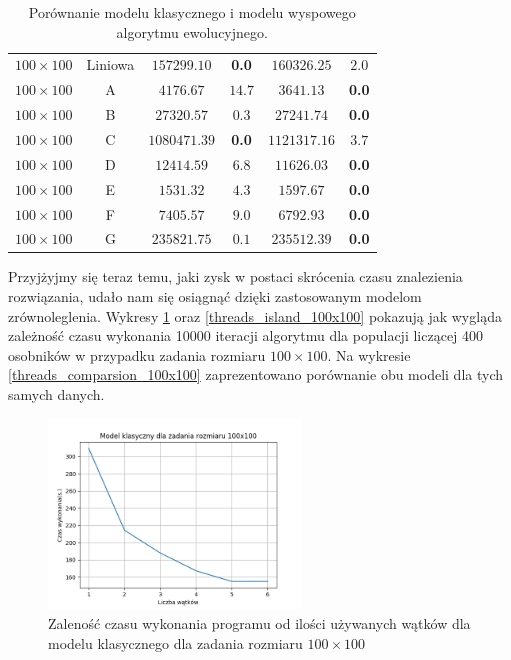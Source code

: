 \begin{table}[H]
\begin{center}
\begin{tabular}{c|c||c|c||c|c}
            \hline
            $100 \times 100$ & Liniowa   & $157299.10$ & \textbf{0.0}            & $160326.25$ & $2.0$ \\
            $100 \times 100$ & A         & $4176.67$ & $14.7$                    & $3641.13$ & \textbf{0.0} \\
            $100 \times 100$ & B         & $27320.57$ & $0.3$                    & $27241.74$ & \textbf{0.0} \\
            $100 \times 100$ & C         & $1080471.39$ & \textbf{0.0}           & $1121317.16$ & $3.7$ \\
            $100 \times 100$ & D         & $12414.59$ & $6.8$                    & $11626.03$ & \textbf{0.0} \\
            $100 \times 100$ & E         & $1531.32$ & $4.3$                     & $1597.67$ & \textbf{0.0} \\
            $100 \times 100$ & F         & $7405.57$ & $9.0$                     & $6792.93$ & \textbf{0.0} \\
            $100 \times 100$ & G         & $235821.75$ & $0.1$                   & $235512.39$ & \textbf{0.0} \\
        \end{tabular}
    \end{center}
    \caption{Porównanie modelu klasycznego i modelu wyspowego algorytmu ewolucyjnego.}
    \label{wyniki-4}
\end{table}

Przyjżyjmy się teraz temu, jaki zysk w postaci skrócenia czasu znalezienia rozwiązania, udało nam się osiągnąć dzięki zastosowanym modelom 
zrównoleglenia. Wykresy \ref{threads_regular_100x100} oraz \ref{threads_island_100x100} pokazują jak wygląda zależność czasu wykonania 10000 iteracji 
algorytmu dla populacji liczącej 400 osobników w przypadku zadania rozmiaru $100 \times 100$. Na wykresie \ref{threads_comparsion_100x100} 
zaprezentowano porównanie obu modeli dla tych samych danych. 

\begin{figure}[H]
    \centering        
    \includegraphics[width=0.6\textwidth]{img/plot_regular_threads_100x100.png}
    \caption{Zaleność czasu wykonania programu od ilości używanych wątków dla modelu klasycznego dla zadania rozmiaru $100\times100$}
    \label{threads_regular_100x100}
\end{figure}

